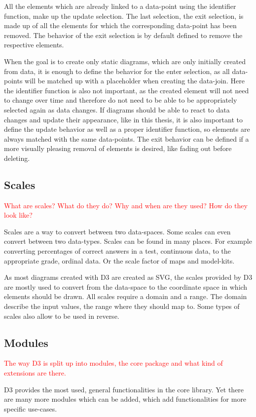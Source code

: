 All the elements which are already linked to a data-point using the identifier function, make up the update selection. The last selection, the exit selection, is made up of all the elements for which the corresponding data-point has been removed. The behavior of the exit selection is by default defined to remove the respective elements.

When the goal is to create only static diagrams, which are only initially created from data, it is enough to define the behavior for the enter selection, as all data-points will be matched up with a placeholder when creating the data-join. Here the identifier function is also not important, as the created element will not need to change over time and therefore do not need to be able to be appropriately selected again as data changes. If diagrams should be able to react to data changes and update their appearance, like in this thesis, it is also important to define the update behavior as well as a proper identifier function, so elements are always matched with the same data-points. The exit behavior can be defined if a more visually pleasing removal of elements is desired, like fading out before deleting.


\subsection{Scales}
\textcolor{red}{
What are scales? What do they do? Why and when are they used? How do they look like?}

Scales are a way to convert between two data-spaces. Some scales can even convert between two data-types. Scales can be found in many places. For example converting percentages of correct answers in a test, continuous data, to the appropriate grade, ordinal data. Or the scale factor of maps and model-kits.

As most diagrams created with D3 are created as SVG, the scales provided by D3 are mostly used to convert from the data-space to the coordinate space in which elements should be drawn. All scales require a domain and a range. The domain describe the input values, the range where they should map to. Some types of scales also allow to be used in reverse. 

\subsection{Modules}
\textcolor{red}{
The way D3 is split up into modules, the core package and what kind of extensions are there.}

D3 provides the most used, general functionalities in the core library. Yet there are many more modules which can be added, which add functionalities for more specific use-cases.
